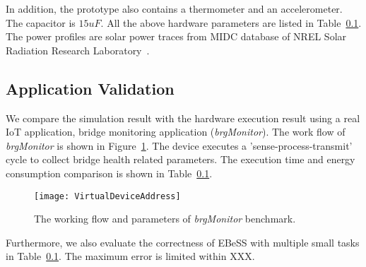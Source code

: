 In addition, the prototype also contains a thermometer and an accelerometer. 
The capacitor is $15uF$. 
All the above hardware parameters are listed in Table~\ref{}.
The power profiles are solar power traces from MIDC database of NREL Solar Radiation Research Laboratory~\cite{midc2015solar}.

\subsection{Application Validation}
We compare the simulation result with the hardware execution result using a real IoT application, bridge monitoring application (\emph{brgMonitor}).
The work flow of \emph{brgMonitor} is shown in Figure~\ref{fig:BrgMonitor}.
The device executes a 'sense-process-transmit' cycle to collect bridge health related parameters.
The execution time and energy consumption comparison is shown in Table~\ref{}.

\begin{figure}[!htpb]
	\centering
	\vspace{-5pt}
	\texttt{[image: VirtualDeviceAddress]}
	\vspace{-5pt}
	\caption{The working flow and parameters of \emph{brgMonitor} benchmark.}	\label{fig:BrgMonitor}
\end{figure}

Furthermore, we also evaluate the correctness of EBeSS with multiple small tasks in Table~\ref{}.
The maximum error is limited within XXX.

%
%

\begin{comment}

 
\end{comment}
